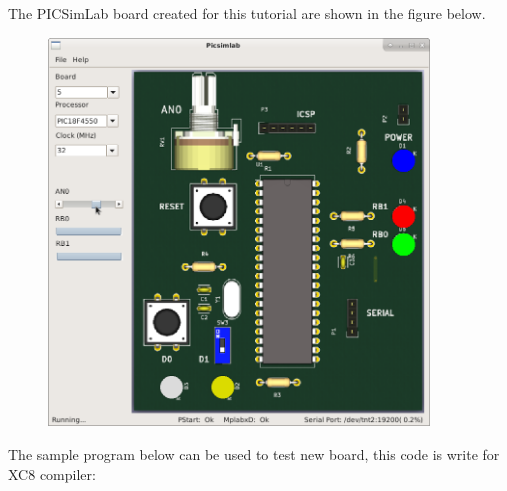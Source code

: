 The PICSimLab board created for this tutorial are shown in the figure below.
\begin{figure}[H]
\center
\includegraphics[width=0.9\textwidth]{img/hb/final.png} 
\end{figure} 

The sample program below can be used to test new board, this code is write for XC8 compiler:
\inputminted[baselinestretch=1.2,fontsize=\footnotesize,linenos]{c}{sample/board_x.c}

